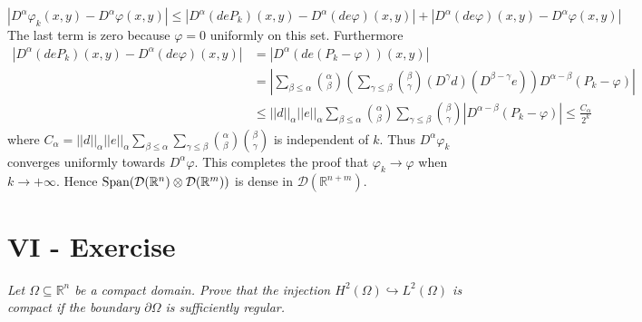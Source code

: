 \documentclass[11pt,a4paper]{article}
\newcommand{\ph}{\varphi}
\newcommand{\il}{\textit}
\newcommand{\R}{\mathbb{R}}
\newcommand{\1}{\mathbbm{1}}
\newcommand{\D}{\mathcal{D}}
\begin{document}
\[ |D^\alpha \ph_k(x,y) - D^\alpha \ph(x,y) | \leq |D^\alpha (deP_k)(x,y) - D^\alpha (de\ph)(x,y) | + |D^\alpha (de\ph)(x,y) - D^\alpha \ph(x,y)| \]
The last term is zero because $\ph =0 $ uniformly on this set. Furthermore
\begin{align*}
|D^\alpha (deP_k)(x,y) - D^\alpha (de\ph)(x,y) | & = |D^\alpha (de(P_k - \ph))(x,y)| \\
& = \left| \sum_{\beta \leq \alpha} \binom{\alpha}{\beta} \left(\sum_{\gamma \leq \beta} \binom{\beta}{\gamma} (D^\gamma d) (D^{\beta - \gamma} e) \right) D^{\alpha - \beta}(P_k - \ph) \right| \\
& \leq ||d||_\alpha ||e||_\alpha \sum_{\beta \leq \alpha} \binom{\alpha}{\beta} \sum_{\gamma \leq \beta} \binom{\beta}{\gamma} | D^{\alpha - \beta} (P_k - \ph) | \leq \frac{C_\alpha}{2^k}
\end{align*}
where $C_\alpha = ||d||_\alpha ||e||_\alpha \sum_{\beta \leq \alpha} \sum_{\gamma \leq \beta} \binom{\alpha}{\beta} \binom{\beta}{\gamma}$ is independent of $k$. Thus $D^\alpha \ph_k$ converges uniformly towards $D^\alpha \ph$. This completes the proof that $\ph_k \to \ph$ when $k \to +\infty$. Hence $\textnormal{Span}(\D(\R^n) \otimes \D(\R^m))$ is dense in $\D(\R^{n+m})$.\newpage
\section*{VI - Exercise}
\il{Let $\Omega \subseteq \R^n$ be a compact domain. Prove that the injection $H^2(\Omega) \hookrightarrow L^2 (\Omega)$ is compact if the boundary $\partial\Omega$ is sufficiently regular.}
\end{document}
